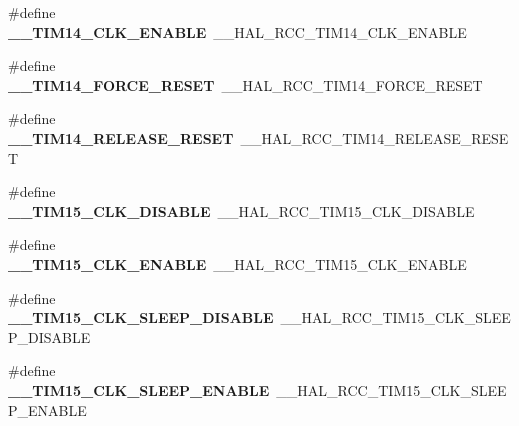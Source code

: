 \begin{DoxyCompactItemize}
\#define {\bfseries \+\_\+\+\_\+\+T\+I\+M14\+\_\+\+C\+L\+K\+\_\+\+E\+N\+A\+B\+LE}~\+\_\+\+\_\+\+H\+A\+L\+\_\+\+R\+C\+C\+\_\+\+T\+I\+M14\+\_\+\+C\+L\+K\+\_\+\+E\+N\+A\+B\+LE
\item 
\mbox{\label{group___h_a_l___r_c_c___aliased_gae83b078b087527043d44dcb3c00b2396}} 
\#define {\bfseries \+\_\+\+\_\+\+T\+I\+M14\+\_\+\+F\+O\+R\+C\+E\+\_\+\+R\+E\+S\+ET}~\+\_\+\+\_\+\+H\+A\+L\+\_\+\+R\+C\+C\+\_\+\+T\+I\+M14\+\_\+\+F\+O\+R\+C\+E\+\_\+\+R\+E\+S\+ET
\item 
\mbox{\label{group___h_a_l___r_c_c___aliased_gadb150e0f413bbb69889b787e2633254b}} 
\#define {\bfseries \+\_\+\+\_\+\+T\+I\+M14\+\_\+\+R\+E\+L\+E\+A\+S\+E\+\_\+\+R\+E\+S\+ET}~\+\_\+\+\_\+\+H\+A\+L\+\_\+\+R\+C\+C\+\_\+\+T\+I\+M14\+\_\+\+R\+E\+L\+E\+A\+S\+E\+\_\+\+R\+E\+S\+ET
\item 
\mbox{\label{group___h_a_l___r_c_c___aliased_gaf520deb7e38c475a833720a8c449bfcd}} 
\#define {\bfseries \+\_\+\+\_\+\+T\+I\+M15\+\_\+\+C\+L\+K\+\_\+\+D\+I\+S\+A\+B\+LE}~\+\_\+\+\_\+\+H\+A\+L\+\_\+\+R\+C\+C\+\_\+\+T\+I\+M15\+\_\+\+C\+L\+K\+\_\+\+D\+I\+S\+A\+B\+LE
\item 
\mbox{\label{group___h_a_l___r_c_c___aliased_ga26324fde431019435e70c6f9546a9116}} 
\#define {\bfseries \+\_\+\+\_\+\+T\+I\+M15\+\_\+\+C\+L\+K\+\_\+\+E\+N\+A\+B\+LE}~\+\_\+\+\_\+\+H\+A\+L\+\_\+\+R\+C\+C\+\_\+\+T\+I\+M15\+\_\+\+C\+L\+K\+\_\+\+E\+N\+A\+B\+LE
\item 
\mbox{\label{group___h_a_l___r_c_c___aliased_ga2edf101c47e6e927889d454f7c3e4c08}} 
\#define {\bfseries \+\_\+\+\_\+\+T\+I\+M15\+\_\+\+C\+L\+K\+\_\+\+S\+L\+E\+E\+P\+\_\+\+D\+I\+S\+A\+B\+LE}~\+\_\+\+\_\+\+H\+A\+L\+\_\+\+R\+C\+C\+\_\+\+T\+I\+M15\+\_\+\+C\+L\+K\+\_\+\+S\+L\+E\+E\+P\+\_\+\+D\+I\+S\+A\+B\+LE
\item 
\mbox{\label{group___h_a_l___r_c_c___aliased_ga9d37421bcf87efc7643928dfafabecf3}} 
\#define {\bfseries \+\_\+\+\_\+\+T\+I\+M15\+\_\+\+C\+L\+K\+\_\+\+S\+L\+E\+E\+P\+\_\+\+E\+N\+A\+B\+LE}~\+\_\+\+\_\+\+H\+A\+L\+\_\+\+R\+C\+C\+\_\+\+T\+I\+M15\+\_\+\+C\+L\+K\+\_\+\+S\+L\+E\+E\+P\+\_\+\+E\+N\+A\+B\+LE
\item 

\end{DoxyCompactItemize}
